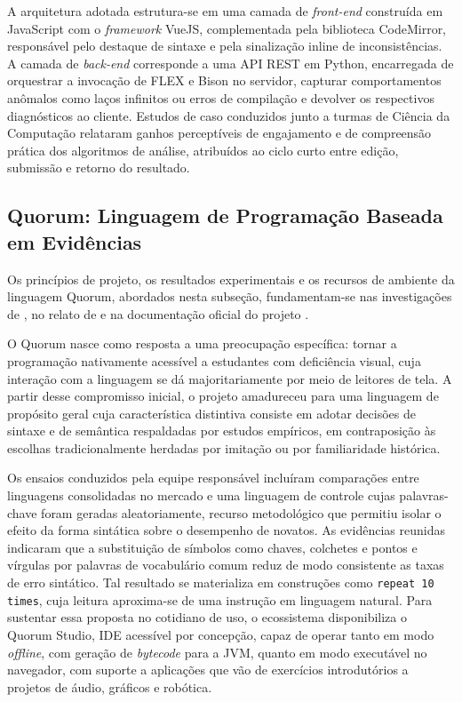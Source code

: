 A arquitetura adotada estrutura-se em uma camada de \textit{front-end} construída em JavaScript com o \textit{framework} VueJS, complementada pela biblioteca CodeMirror, responsável pelo destaque de sintaxe e pela sinalização inline de inconsistências. A camada de \textit{back-end} corresponde a uma API REST em Python, encarregada de orquestrar a invocação de FLEX e Bison no servidor, capturar comportamentos anômalos como laços infinitos ou erros de compilação e devolver os respectivos diagnósticos ao cliente. Estudos de caso conduzidos junto a turmas de Ciência da Computação relataram ganhos perceptíveis de engajamento e de compreensão prática dos algoritmos de análise, atribuídos ao ciclo curto entre edição, submissão e retorno do resultado.

\subsection{Quorum: Linguagem de Programação Baseada em Evidências}

Os princípios de projeto, os resultados experimentais e os recursos de ambiente da linguagem Quorum, abordados nesta subseção, fundamentam-se nas investigações de , no relato de  e na documentação oficial do projeto .

O Quorum nasce como resposta a uma preocupação específica: tornar a programação nativamente acessível a estudantes com deficiência visual, cuja interação com a linguagem se dá majoritariamente por meio de leitores de tela. A partir desse compromisso inicial, o projeto amadureceu para uma linguagem de propósito geral cuja característica distintiva consiste em adotar decisões de sintaxe e de semântica respaldadas por estudos empíricos, em contraposição às escolhas tradicionalmente herdadas por imitação ou por familiaridade histórica.

Os ensaios conduzidos pela equipe responsável incluíram comparações entre linguagens consolidadas no mercado e uma linguagem de controle cujas palavras-chave foram geradas aleatoriamente, recurso metodológico que permitiu isolar o efeito da forma sintática sobre o desempenho de novatos. As evidências reunidas indicaram que a substituição de símbolos como chaves, colchetes e pontos e vírgulas por palavras de vocabulário comum reduz de modo consistente as taxas de erro sintático. Tal resultado se materializa em construções como \texttt{repeat 10 times}, cuja leitura aproxima-se de uma instrução em linguagem natural. Para sustentar essa proposta no cotidiano de uso, o ecossistema disponibiliza o Quorum Studio, IDE acessível por concepção, capaz de operar tanto em modo \textit{offline}, com geração de \textit{bytecode} para a JVM, quanto em modo executável no navegador, com suporte a aplicações que vão de exercícios introdutórios a projetos de áudio, gráficos e robótica.

